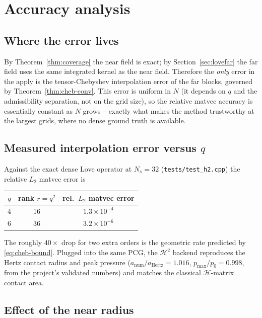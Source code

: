 \documentclass[11pt,a4paper]{article}
\newcommand{\Htwo}{\mathcal{H}^2}
\newcommand{\Hmat}{\mathcal{H}}
\newcommand{\code}[1]{\texttt{#1}}
\theoremstyle{definition}
\theoremstyle{remark}
\begin{document}
\section{Accuracy analysis}
\label{sec:accuracy}

\subsection{Where the error lives}

By Theorem~\ref{thm:coverage} the near field is exact; by
Section~\ref{sec:lovefar} the far field uses the same integrated kernel as the
near field. Therefore the \emph{only} error in the apply is the tensor-Chebyshev
interpolation error of the far blocks, governed by Theorem~\ref{thm:cheb-conv}.
This error is uniform in $N$ (it depends on $q$ and the admissibility separation,
not on the grid size), so the relative matvec accuracy is essentially constant as
$N$ grows -- exactly what makes the method trustworthy at the largest grids,
where no dense ground truth is available.

\subsection{Measured interpolation error versus $q$}

Against the exact dense Love operator at $N_s=32$
(\code{tests/test\_h2.cpp}) the relative $L_2$ matvec error is
\begin{center}
\begin{tabular}{ccc}
\toprule
$q$ & rank $r=q^2$ & rel.\ $L_2$ matvec error \\
\midrule
4 & 16 & $1.3\times10^{-4}$ \\
6 & 36 & $3.2\times10^{-6}$ \\
\bottomrule
\end{tabular}
\end{center}
The roughly $40\times$ drop for two extra orders is the geometric rate predicted
by \eqref{eq:cheb-bound}. Plugged into the same PCG, the $\Htwo$ backend
reproduces the Hertz contact radius and peak pressure
($a_{\text{num}}/a_{\text{Hertz}}=1.016$, $p_{\max}/p_0=0.998$, from the
project's validated numbers) and matches the classical $\Hmat$-matrix contact
area.

\subsection{Effect of the near radius}
\end{document}
